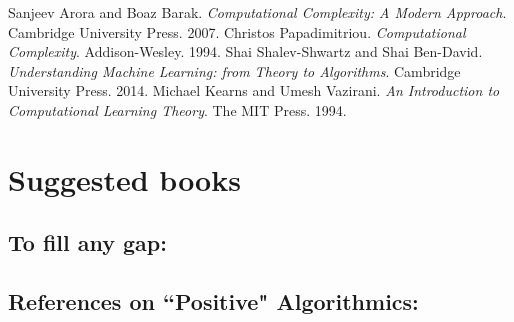 \documentclass{article}
\begin{document}
\begin{comment}
			\paragraph{Solution.}
			\mbox{}
			
			\begin{enumerate}
				\item {\footnotesize 3COL} in \textbf{NP} (previous exercise session)
				\item {\footnotesize 3COL} is \textbf{NP}-Hard by showing that {\footnotesize 3SAT}
			\end{enumerate}
		\end{exercise}
\end{comment}






	\cleardoublepage
	\begin{thebibliography}{9}
			Sanjeev Arora and Boaz Barak. \emph{Computational Complexity: A Modern Approach}. Cambridge University Press. 2007.
			Christos Papadimitriou. \emph{Computational Complexity}. Addison-Wesley. 1994.
			Shai Shalev-Shwartz and Shai Ben-David. \emph{Understanding Machine Learning: from Theory to Algorithms}. Cambridge University Press. 2014.
			Michael Kearns and Umesh Vazirani. \emph{An Introduction to Computational Learning Theory}. The MIT Press. 1994.
	\end{thebibliography}


	\appendix
	\newpage
	\section{Suggested books}
		\subsection*{To fill any gap:}
			\begin{figure}[h]
   				\setlength{\fboxsep}{0pt}
   				\setlength{\fboxrule}{0.7pt}
			\end{figure}
		
		\subsection*{References on ``Positive" Algorithmics:}
			\begin{figure}[h]
   				\setlength{\fboxsep}{0pt}
   				\setlength{\fboxrule}{0.7pt}
   				\setlength{\fboxsep}{0pt}
   				\setlength{\fboxrule}{0.7pt}
			\end{figure}
	\cleardoublepage
\end{document}
